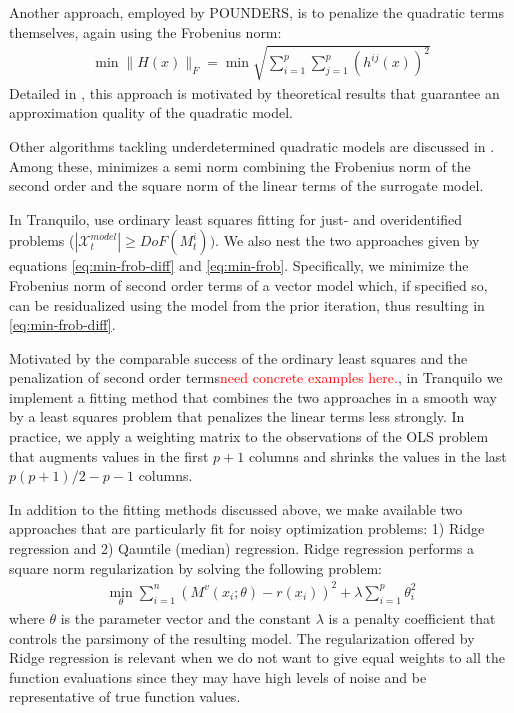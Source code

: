 Another approach, employed by POUNDERS, is to penalize the quadratic terms themselves, again using the Frobenius norm:
\begin{align}
\min\lVert H(x)\rVert_F =\min\sqrt{\sum\limits_{i=1}^p\sum\limits_{j=1}^{p}(h^{ij}(x))^2}
\label{eq:min-frob}
\end{align}
Detailed in \cite{Wild2008}, this approach is motivated by theoretical results that guarantee an approximation quality of the quadratic model.

Other algorithms tackling underdetermined quadratic models are discussed in \cite{Larson2019}. Among these, \cite{Powell2012} minimizes a semi norm combining the Frobenius norm of the second order and the square norm of the linear terms of the surrogate model.

In Tranquilo, use ordinary least squares fitting for just- and overidentified problems ($|\mathcal{X}_t^{model}|\geq DoF(M_t^{i}))$. We also nest the two approaches given by equations \ref{eq:min-frob-diff} and \ref{eq:min-frob}. Specifically, we minimize the Frobenius norm of second order terms of a vector model which, if specified so, can be residualized using the model from the prior iteration, thus resulting in \ref{eq:min-frob-diff}.

Motivated by the comparable success of the ordinary least squares and the penalization of second order terms\textcolor{red}{need concrete examples here.}, in Tranquilo we implement a fitting method that combines the two approaches in a smooth way by a least squares problem that penalizes the linear terms less strongly. In practice, we apply a weighting matrix to the observations of the OLS problem that augments values in the first $p+1$ columns and shrinks the values in the last $p(p+1)/2-p-1$ columns.

In addition to the fitting methods discussed above, we make available two approaches that are particularly fit for noisy optimization problems: 1) Ridge regression and 2) Qauntile (median) regression. Ridge regression performs a square norm regularization by solving the following problem:
\begin{align}
    \min\limits_{\theta}\sum\limits_{i=1}^{n}(M^v(x_i;\theta)-r(x_i))^2+\lambda\sum\limits_{i=1}^{p}\theta_i^2
    \label{eq:fit-ridge}
\end{align}
where $\theta$ is the parameter vector and the constant $\lambda$ is a penalty coefficient that controls the parsimony of the resulting model. The regularization offered by Ridge regression is relevant when we do not want to give equal weights to all the function evaluations since they may have high levels of noise and be representative of true function values.

